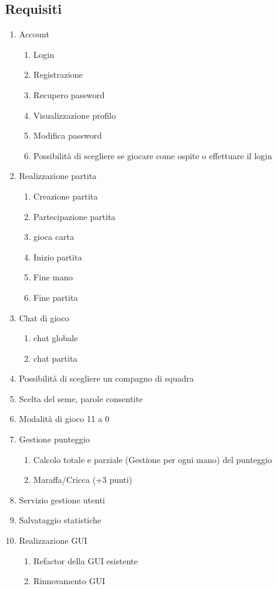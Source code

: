 \subsection{Requisiti}
\begin{enumerate}
    \item Account
        \begin{enumerate}
            \item Login
            \item Registrazione
            \item Recupero password
            \item Visualizzazione profilo
            \item Modifica password
            \item Possibilità di scegliere se giocare come ospite o effettuare il login
        \end{enumerate}
    \item Realizzazione partita
        \begin{enumerate}
            \item Creazione partita
            \item Partecipazione partita
            \item gioca carta
            \item Inizio partita
            \item Fine mano
            \item Fine partita
        \end{enumerate}
    \item Chat di gioco
        \begin{enumerate}
            \item chat globale
            \item chat partita
        \end{enumerate}
    \item Possibilità di scegliere un compagno di squadra
    \item Scelta del seme, parole consentite
    \item Modalità di gioco 11 a 0
    \item Gestione punteggio
        \begin{enumerate}
            \item Calcolo totale e parziale (Gestione per ogni mano) del punteggio
            \item Maraffa/Cricca (+3 punti)
        \end{enumerate}
    \item Servizio gestione utenti
    \item Salvataggio statistiche
    \item Realizzazione GUI
        \begin{enumerate}
            \item Refactor della GUI esistente
            \item Rinnovamento GUI
        \end{enumerate}
\end{enumerate}
